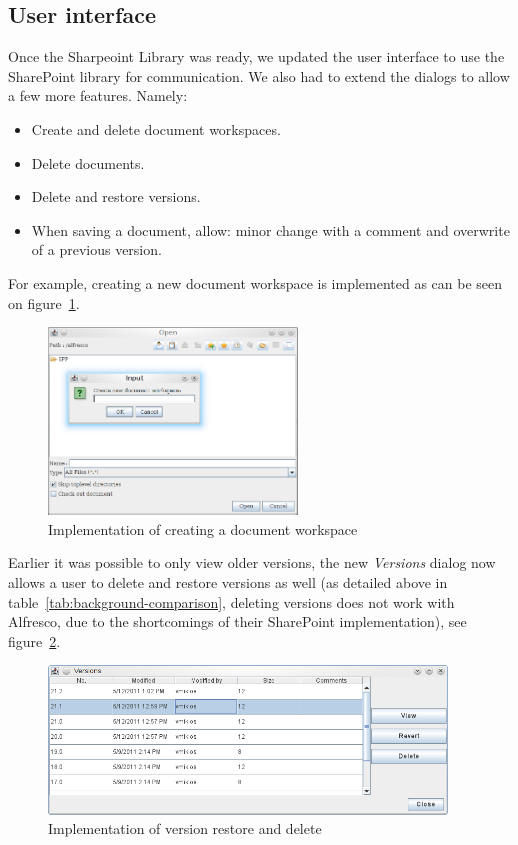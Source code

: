\subsection{User interface}

Once the Sharpeoint Library was ready, we updated the user interface to use the
SharePoint library for communication. We also had to extend the dialogs to allow
a few more features. Namely:

\begin{itemize}
\item Create and delete document workspaces.
\item Delete documents.
\item Delete and restore versions.
\item When saving a document, allow: minor change with a comment and overwrite of a previous version.
\end{itemize}

For example, creating a new document workspace is implemented as can be seen on
figure~\ref{fig:implementation-createdws}.

\begin{figure}[H]
\centering
\includegraphics[width=250px,keepaspectratio]{implementation-createdws.png}
\caption{Implementation of creating a document workspace}
\label{fig:implementation-createdws}
\end{figure}

Earlier it was possible to only view older versions, the new \emph{Versions}
dialog now allows a user to delete and restore versions as well (as detailed
above in table~\ref{tab:background-comparison}, deleting versions does not work
with Alfresco, due to the shortcomings of their SharePoint implementation), see
figure~\ref{fig:implementation-versiondialog}.

\begin{figure}[H]
\centering
\includegraphics[width=400px,keepaspectratio]{implementation-versiondialog.png}
\caption{Implementation of version restore and delete}
\label{fig:implementation-versiondialog}
\end{figure}

